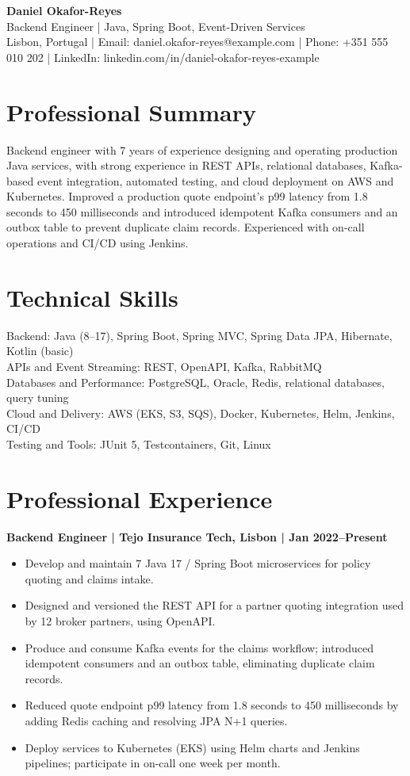 \documentclass[11pt,a4paper]{article}
\begin{document}
\begin{center}
{\Huge\bfseries\color{primarycolor} Daniel Okafor-Reyes}\\[0.35em]
{\large\color{accentcolor} Backend Engineer | Java, Spring Boot, Event-Driven Services}\\[0.3em]
Lisbon, Portugal | Email: daniel.okafor-reyes@example.com | Phone: +351 555 010 202 | LinkedIn: linkedin.com/in/daniel-okafor-reyes-example
\end{center}

\section*{Professional Summary}
Backend engineer with 7 years of experience designing and operating production Java services, with strong experience in REST APIs, relational databases, Kafka-based event integration, automated testing, and cloud deployment on AWS and Kubernetes. Improved a production quote endpoint's p99 latency from 1.8 seconds to 450 milliseconds and introduced idempotent Kafka consumers and an outbox table to prevent duplicate claim records. Experienced with on-call operations and CI/CD using Jenkins.

\section*{Technical Skills}
Backend: Java (8–17), Spring Boot, Spring MVC, Spring Data JPA, Hibernate, Kotlin (basic)\\
APIs and Event Streaming: REST, OpenAPI, Kafka, RabbitMQ\\
Databases and Performance: PostgreSQL, Oracle, Redis, relational databases, query tuning\\
Cloud and Delivery: AWS (EKS, S3, SQS), Docker, Kubernetes, Helm, Jenkins, CI/CD\\
Testing and Tools: JUnit 5, Testcontainers, Git, Linux

\section*{Professional Experience}
\textbf{Backend Engineer | Tejo Insurance Tech, Lisbon | Jan 2022–Present}
\begin{itemize}
\item Develop and maintain 7 Java 17 / Spring Boot microservices for policy quoting and claims intake.
\item Designed and versioned the REST API for a partner quoting integration used by 12 broker partners, using OpenAPI.
\item Produce and consume Kafka events for the claims workflow; introduced idempotent consumers and an outbox table, eliminating duplicate claim records.
\item Reduced quote endpoint p99 latency from 1.8 seconds to 450 milliseconds by adding Redis caching and resolving JPA N+1 queries.
\item Deploy services to Kubernetes (EKS) using Helm charts and Jenkins pipelines; participate in on-call one week per month.
\end{itemize}
\end{document}
